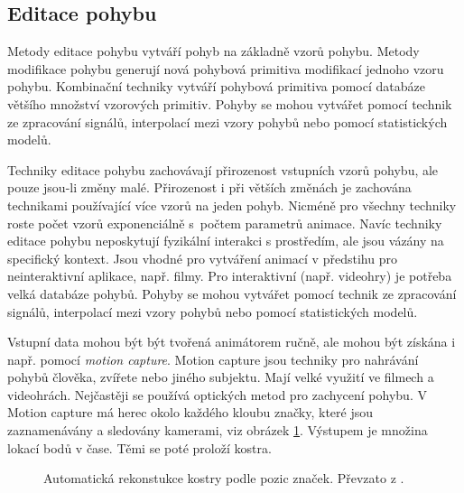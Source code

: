 \subsection{Editace pohybu}
Metody editace pohybu vytváří pohyb na základně vzorů pohybu. Metody modifikace pohybu generují nová pohybová primitiva modifikací jednoho vzoru pohybu. Kombinační techniky vytváří pohybová primitiva pomocí databáze většího množství vzorových primitiv. Pohyby se mohou vytvářet pomocí technik ze zpracování signálů, interpolací mezi vzory pohybů nebo pomocí statistických modelů. 

Techniky editace pohybu zachovávají přirozenost vstupních vzorů pohybu, ale pouze jsou-li změny malé. Přirozenost i při větších změnách je zachována technikami používající více vzorů na jeden pohyb. Nicméně pro všechny techniky roste počet vzorů  exponenciálně s~počtem parametrů animace. Navíc techniky editace pohybu neposkytují fyzikální interakci s prostředím, ale jsou vázány na specifický kontext. Jsou vhodné pro vytváření animací v předstihu pro neinteraktivní aplikace, např. filmy. Pro interaktivní (např. videohry) je potřeba velká databáze pohybů. Pohyby se mohou vytvářet pomocí technik ze zpracování signálů, interpolací mezi vzory pohybů nebo pomocí statistických modelů.

Vstupní data mohou být být tvořená animátorem ručně, ale mohou být získána i např. pomocí \textit{motion capture}. Motion capture  \cite{motion_capture} jsou techniky pro nahrávání pohybů člověka, zvířete nebo jiného subjektu. Mají velké využití ve filmech a videohrách. Nejčastěji se používá optických metod pro zachycení pohybu. V Motion capture má herec okolo každého kloubu značky, které jsou zaznamenávány a sledovány kamerami, viz obrázek \ref{motion_capture_img}. Výstupem je množina lokací bodů v čase. Těmi se poté proloží kostra.
\begin{figure}[h]
\begin{center}
\caption{Automatická rekonstukce kostry podle pozic značek. Převzato z \cite{motion_capture}.} \label{motion_capture_img}
\end{center}
\end{figure}

